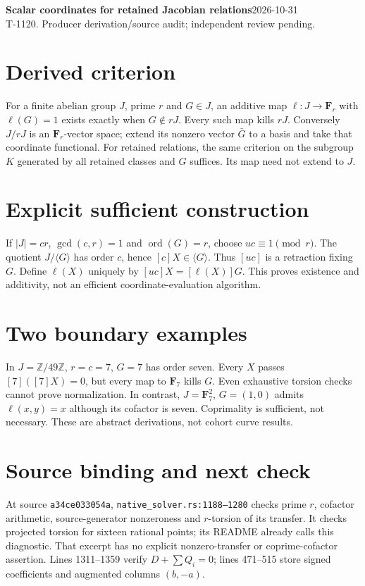 \documentclass[10pt]{article}
\begin{document}
\textbf{Scalar coordinates for retained Jacobian relations}\hfill 2026-10-31\\
T-1120. Producer derivation/source audit; independent review pending.
\section*{Derived criterion}
For a finite abelian group $J$, prime $r$ and $G\in J$, an additive map $\ell:J\to\mathbf F_r$ with $\ell(G)=1$ exists exactly when $G\notin rJ$. Every such map kills $rJ$. Conversely $J/rJ$ is an $\mathbf F_r$-vector space; extend its nonzero vector $\bar G$ to a basis and take that coordinate functional. For retained relations, the same criterion on the subgroup $K$ generated by all retained classes and $G$ suffices. Its map need not extend to $J$.
\section*{Explicit sufficient construction}
If $|J|=cr$, $\gcd(c,r)=1$ and $\operatorname{ord}(G)=r$, choose $uc\equiv1\pmod r$. The quotient $J/\langle G\rangle$ has order $c$, hence $[c]X\in\langle G\rangle$. Thus $[uc]$ is a retraction fixing $G$. Define $\ell(X)$ uniquely by $[uc]X=[\ell(X)]G$. This proves existence and additivity, not an efficient coordinate-evaluation algorithm.
\begin{center}\end{center}
\section*{Two boundary examples}
In $J=\mathbb Z/49\mathbb Z$, $r=c=7$, $G=7$ has order seven. Every $X$ passes $[7]([7]X)=0$, but every map to $\mathbf F_7$ kills $G$. Even exhaustive torsion checks cannot prove normalization. In contrast, $J=\mathbf F_7^2$, $G=(1,0)$ admits $\ell(x,y)=x$ although its cofactor is seven. Coprimality is sufficient, not necessary. These are abstract derivations, not cohort curve results.
\section*{Source binding and next check}
At source \texttt{a34ce033054a}, \texttt{native\_solver.rs:1188--1280} checks prime $r$, cofactor arithmetic, source-generator nonzeroness and $r$-torsion of its transfer. It checks projected torsion for sixteen rational points; its README already calls this diagnostic. That excerpt has no explicit nonzero-transfer or coprime-cofactor assertion. Lines 1311--1359 verify $D+\sum Q_i=0$; lines 471--515 store signed coefficients and augmented columns $(b,-a)$.
\end{document}
